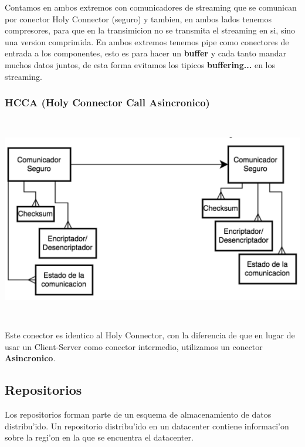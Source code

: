Contamos en ambos extremos con comunicadores de streaming que se comunican por conector Holy Connector (seguro) y tambien, en ambos lados tenemos compresores, para que en la transimicion no se transmita el streaming en si, sino una version comprimida.
En ambos extremos tenemos pipe como conectores de entrada a los componentes, esto es para hacer un \textbf{buffer} y cada tanto mandar muchos datos juntos, de esta forma evitamos los tipicos \textbf{buffering...} en los streaming.


\subsubsection{HCCA (Holy Connector Call Asincronico)}

\includegraphics[height=9cm]{diagramas/HCCA} 

Este conector es identico al Holy Connector, con la diferencia de que en lugar de usar un Client-Server como conector intermedio, utilizamos un conector \textbf{Asincronico}.

\subsection{Repositorios}

Los repositorios forman parte de un esquema de almacenamiento de datos distribu'ido. Un repositorio distribu'ido en un datacenter contiene informaci'on sobre la regi'on en la que se encuentra el datacenter.

